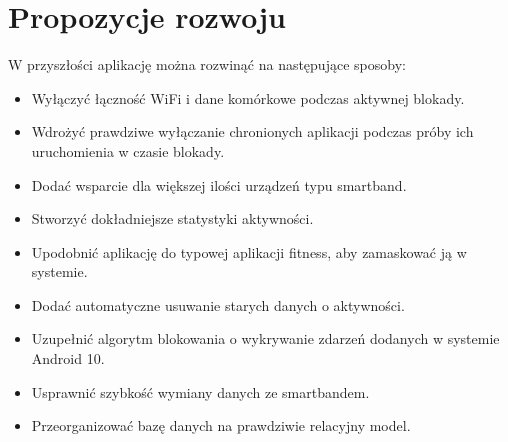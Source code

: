 \section{Propozycje rozwoju}
W przyszłości aplikację można rozwinąć na następujące sposoby:
\begin{itemize}
    \item Wyłączyć łączność WiFi i dane komórkowe podczas aktywnej blokady. 
    \item Wdrożyć prawdziwe wyłączanie chronionych aplikacji podczas próby ich uruchomienia w czasie blokady.
    \item Dodać wsparcie dla większej ilości urządzeń typu smartband.
    \item Stworzyć dokładniejsze statystyki aktywności.
    \item Upodobnić aplikację do typowej aplikacji fitness, aby zamaskować ją w systemie.
    \item Dodać automatyczne usuwanie starych danych o aktywności.
    \item Uzupełnić algorytm blokowania o wykrywanie zdarzeń dodanych w systemie Android 10.
    \item Usprawnić szybkość wymiany danych ze smartbandem.
    \item Przeorganizować bazę danych na prawdziwie relacyjny model.
\end{itemize}






